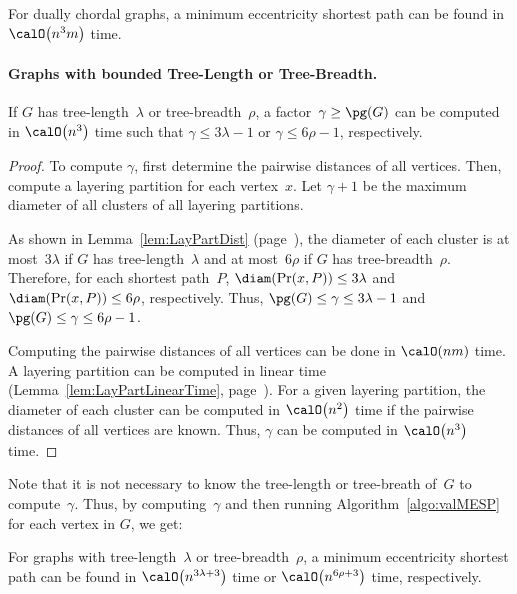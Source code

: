 \begin{corollary}
For dually chordal graphs, a minimum eccentricity shortest path can be found in \( \calO \big( n^3 m \big) \) time.
\end{corollary}

\paragraph{Graphs with bounded Tree-Length or Tree-Breadth.}

\begin{lemma}
If \( G \) has tree-length~\( \lambda \) or tree-breadth~\( \rho \), a factor~\( \gamma \geq \pg(G) \) can be computed in \( \calO \big( n^3 \big) \) time such that \( \gamma \leq 3 \lambda - 1 \) or \( \gamma \leq 6 \rho - 1 \), respectively.
\end{lemma}

\begin{proof}
To compute $\gamma$, first determine the pairwise distances of all vertices.
Then, compute a layering partition for each vertex~$x$.
Let $\gamma + 1$ be the maximum diameter of all clusters of all layering partitions.

As shown in Lemma~\ref{lem:LayPartDist} (page~\pageref{lem:LayPartDist}), the diameter of each cluster is at most~$3 \lambda$ if $G$ has tree-length~$\lambda$ and at most~$6 \rho$ if $G$ has tree-breadth~$\rho$.
Therefore, for each shortest path~$P$, $\diam(\Pr(x, P)) \leq 3 \lambda$ and $\diam(\Pr(x, P)) \leq 6 \rho$, respectively.
Thus, $\pg(G) \leq \gamma \leq 3 \lambda - 1$ and $\pg(G) \leq \gamma \leq 6 \rho - 1$.

Computing the pairwise distances of all vertices can be done in $\calO(nm)$ time.
A layering partition can be computed in linear time (Lemma~\ref{lem:LayPartLinearTime}, page~\pageref{lem:LayPartLinearTime}).
For a given layering partition, the diameter of each cluster can be computed in $\calO \big( n^2 \big)$ time if the pairwise distances of all vertices are known.
Thus, $\gamma$ can be computed in $\calO \big( n^3 \big)$ time.
\end{proof}

Note that it is not necessary to know the tree-length or tree-breath of~$G$ to compute~$\gamma$.
Thus, by computing~$\gamma$ and then running Algorithm~\ref{algo:valMESP} for each vertex in $G$, we get:

\begin{corollary}
For graphs with tree-length~\( \lambda \) or tree-breadth~\( \rho \), a minimum eccentricity shortest path can be found in \( \calO \big( n^{3\lambda+3} \big) \) time or \( \calO \big( n^{6\rho+3} \big) \) time, respectively.
\end{corollary}



